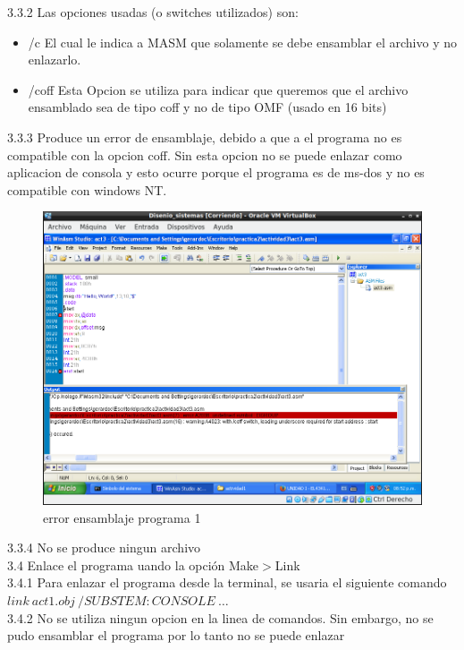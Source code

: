 \large{3.3.2} Las opciones usadas (o switches utilizados) son:
\begin{itemize}
  \item  /c  El cual le indica a MASM que solamente se debe ensamblar el archivo y no enlazarlo.
  \item  /coff Esta Opcion se utiliza para indicar que queremos que el archivo ensamblado sea de tipo coff y no de tipo OMF (usado en 16 bits)
\end{itemize}

\large{3.3.3} Produce un error de ensamblaje, debido a que a el programa no es compatible con la opcion coff. Sin esta opcion no se puede enlazar como aplicacion de consola y esto ocurre porque el programa es de ms-dos y no es compatible con windows NT.

\begin{figure}[H]
  \includegraphics[width=\linewidth]{practica2/imagenes/ej3/error.png}
  \caption{error ensamblaje programa 1}
\end{figure}

\large{3.3.4} No se produce ningun archivo\\

\large{3.4} Enlace el programa uando la opción Make$>$Link\\

\large{3.4.1} Para enlazar el programa desde la terminal, se usaria el siguiente comando $link\ act1.obj\ /SUBSTEM:CONSOLE\ \dots$\\

\large{3.4.2} No se utiliza ningun opcion en la linea de comandos.
Sin embargo, no se pudo ensamblar el programa por lo tanto no se puede enlazar\\

